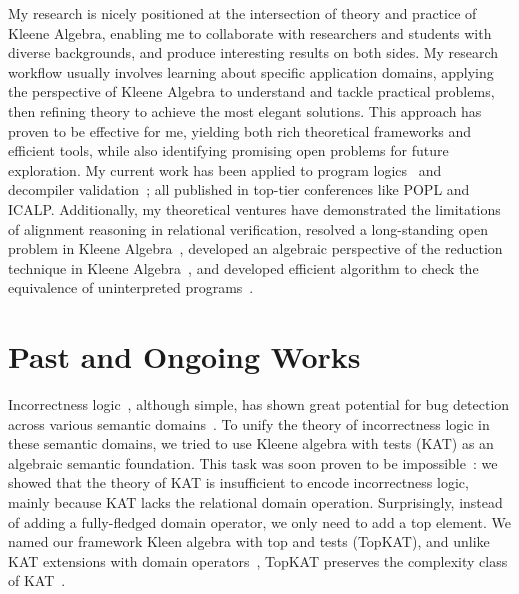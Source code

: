 \documentclass[11pt,a4paper,sans]{moderncv} %
\begin{document}
My research is nicely positioned at the intersection of theory and practice of Kleene Algebra, enabling me to collaborate with researchers and students with diverse backgrounds, and produce interesting results on both sides. 
My research workflow usually involves learning about specific application domains, applying the perspective of Kleene Algebra to understand and tackle practical problems, then refining theory to achieve the most elegant solutions. 
This approach has proven to be effective for me, yielding both rich theoretical frameworks and efficient tools, while also identifying promising open problems for future exploration. 
My current work has been applied to program logics~\cite{zhang_IncorrectnessLogicKleene_2022,zhang_DomainReasoningTopKAT_2024} and decompiler validation~\cite{zhang_CFGKATEfficientValidation_2025}; all published in top-tier conferences like POPL and ICALP. 
Additionally, my theoretical ventures have demonstrated the limitations of alignment reasoning in relational verification, resolved a long-standing open problem in Kleene Algebra~\cite{azevedodeamorim_KleeneAlgebraCommutativity_2024a}, developed an algebraic perspective of the reduction technique in Kleene Algebra~\cite{zhang_DomainReasoningTopKAT_2024}, and developed efficient algorithm to check the equivalence of uninterpreted programs~\cite{zhang_EfficientSymbolicAlgorithms_2025}.

\section{Past and Ongoing Works}


Incorrectness logic~\cite{ohearn_IncorrectnessLogic_2020}, although simple, has shown great potential for bug detection across various semantic domains~\cite{raad_LocalReasoningPresence_2020,le_FindingRealBugs_2022, zhang_QuantitativeStrongestPost_2022b}.
To unify the theory of incorrectness logic in these semantic domains, we tried to use Kleene algebra with tests (KAT) as an algebraic semantic foundation. 
This task was soon proven to be impossible~\cite{zhang_IncorrectnessLogicKleene_2022}: we showed that the theory of KAT is insufficient to encode incorrectness logic, mainly because KAT lacks the relational domain operation.
Surprisingly, instead of adding a fully-fledged domain operator, we only need to add a top element.
We named our framework Kleen algebra with top and tests (TopKAT), and unlike KAT extensions with domain operators~\cite{desharnais_KleeneAlgebraDomain_2006,sedlar_ComplexityKleeneAlgebra_2023}, TopKAT preserves the complexity class of KAT~\cite{zhang_IncorrectnessLogicKleene_2022}.
\end{document}
